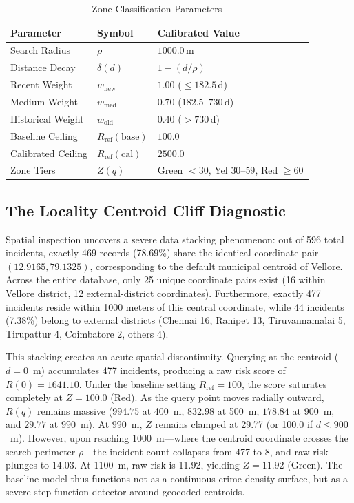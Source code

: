 \documentclass[conference]{IEEEtran}
\begin{document}
\begin{table}[b]
\centering
\caption{Zone Classification Parameters}
\label{tab:zone_params}
\begin{tabular}{lll}
\toprule
\textbf{Parameter} & \textbf{Symbol} & \textbf{Calibrated Value} \\
\midrule
Search Radius & $\rho$ & $1000.0\,\text{m}$ \\
Distance Decay & $\delta(d)$ & $1 - (d / \rho)$ \\
Recent Weight & $w_{\text{new}}$ & $1.00$ ($\le 182.5\,\text{d}$) \\
Medium Weight & $w_{\text{med}}$ & $0.70$ ($182.5\text{--}730\,\text{d}$) \\
Historical Weight & $w_{\text{old}}$ & $0.40$ ($> 730\,\text{d}$) \\
Baseline Ceiling & $R_{\text{ref}}(\text{base})$ & $100.0$ \\
Calibrated Ceiling & $R_{\text{ref}}(\text{cal})$ & $2500.0$ \\
Zone Tiers & $Z(q)$ & Green $<30$, Yel $30\text{--}59$, Red $\ge 60$ \\
\bottomrule
\end{tabular}
\end{table}

\subsection{The Locality Centroid Cliff Diagnostic}
Spatial inspection uncovers a severe data stacking phenomenon: out of 596 total incidents, exactly 469 records (78.69\%) share the identical coordinate pair $(12.9165, 79.1325)$, corresponding to the default municipal centroid of Vellore. Across the entire database, only 25 unique coordinate pairs exist (16 within Vellore district, 12 external-district coordinates). Furthermore, exactly 477 incidents reside within 1000 meters of this central coordinate, while 44 incidents (7.38\%) belong to external districts (Chennai 16, Ranipet 13, Tiruvannamalai 5, Tirupattur 4, Coimbatore 2, others 4).

This stacking creates an acute spatial discontinuity. Querying at the centroid ($d = 0$~m) accumulates 477 incidents, producing a raw risk score of $R(0) = 1641.10$. Under the baseline setting $R_{\text{ref}} = 100$, the score saturates completely at $Z = 100.0$ (Red). As the query point moves radially outward, $R(q)$ remains massive ($994.75$ at 400~m, $832.98$ at 500~m, $178.84$ at 900~m, and $29.77$ at 990~m). At 990~m, $Z$ remains clamped at 29.77 (or 100.0 if $d \le 900$~m). However, upon reaching 1000~m---where the centroid coordinate crosses the search perimeter $\rho$---the incident count collapses from 477 to 8, and raw risk plunges to 14.03. At 1100~m, raw risk is 11.92, yielding $Z = 11.92$ (Green). The baseline model thus functions not as a continuous crime density surface, but as a severe step-function detector around geocoded centroids.
\end{document}
